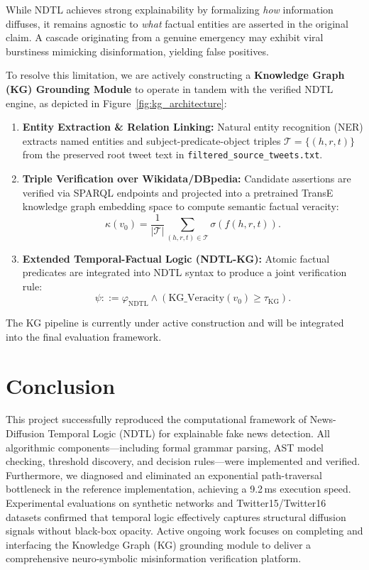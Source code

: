 \documentclass[10pt,twocolumn]{article}
\begin{document}
While NDTL achieves strong explainability by formalizing \textit{how} information diffuses, it remains agnostic to \textit{what} factual entities are asserted in the original claim. A cascade originating from a genuine emergency may exhibit viral burstiness mimicking disinformation, yielding false positives.

To resolve this limitation, we are actively constructing a \textbf{Knowledge Graph (KG) Grounding Module} to operate in tandem with the verified NDTL engine, as depicted in Figure~\ref{fig:kg_architecture}:
\begin{enumerate}
    \item \textbf{Entity Extraction \& Relation Linking:} Natural entity recognition (NER) extracts named entities and subject-predicate-object triples $\mathcal{T} = \{(h, r, t)\}$ from the preserved root tweet text in \texttt{filtered\_source\_tweets.txt}.
    \item \textbf{Triple Verification over Wikidata/DBpedia:} Candidate assertions are verified via SPARQL endpoints and projected into a pretrained TransE knowledge graph embedding space to compute semantic factual veracity:
    \begin{equation}
    \kappa(v_0) = \frac{1}{|\mathcal{T}|} \sum_{(h,r,t) \in \mathcal{T}} \sigma(f(h, r, t)).
    \end{equation}
    \item \textbf{Extended Temporal-Factual Logic (NDTL-KG):} Atomic factual predicates are integrated into NDTL syntax to produce a joint verification rule:
    \begin{equation}
    \psi ::= \varphi_{\text{NDTL}} \land (\text{KG\_Veracity}(v_0) \ge \tau_{\text{KG}}).
    \end{equation}
\end{enumerate}
The KG pipeline is currently under active construction and will be integrated into the final evaluation framework.

\section{Conclusion}

This project successfully reproduced the computational framework of News-Diffusion Temporal Logic (NDTL) for explainable fake news detection. All algorithmic components—including formal grammar parsing, AST model checking, threshold discovery, and decision rules—were implemented and verified. Furthermore, we diagnosed and eliminated an exponential path-traversal bottleneck in the reference implementation, achieving a 9.2\,ms execution speed. Experimental evaluations on synthetic networks and Twitter15/Twitter16 datasets confirmed that temporal logic effectively captures structural diffusion signals without black-box opacity. Active ongoing work focuses on completing and interfacing the Knowledge Graph (KG) grounding module to deliver a comprehensive neuro-symbolic misinformation verification platform.
\end{document}
